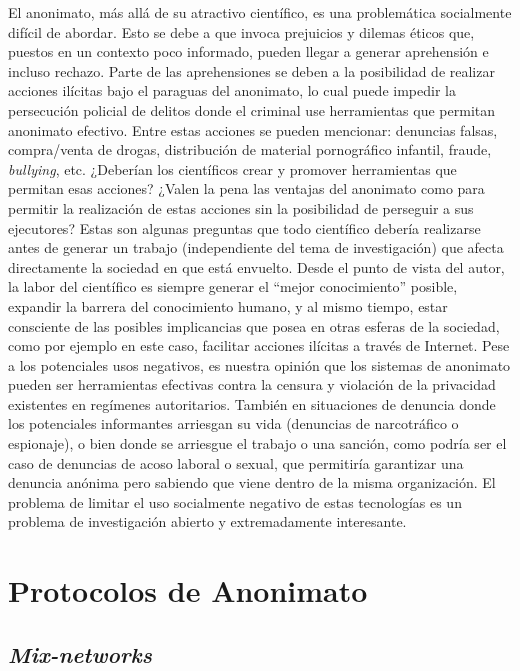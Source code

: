 El anonimato, más allá de su atractivo científico, es una problemática 
socialmente difícil de abordar. Esto se debe a que invoca prejuicios y dilemas 
éticos que, puestos en un contexto poco informado, pueden llegar a generar 
aprehensión e incluso rechazo. Parte de las aprehensiones se deben a la 
posibilidad de realizar acciones ilícitas bajo el paraguas del anonimato, lo 
cual puede impedir la persecución policial de delitos donde el criminal use 
herramientas que permitan anonimato efectivo. Entre estas acciones se pueden 
mencionar: denuncias falsas, compra/venta de drogas, distribución de material 
pornográfico infantil, fraude, \emph{bullying}, etc. ¿Deberían los científicos 
crear y promover herramientas que permitan esas acciones? ¿Valen la pena las 
ventajas del anonimato como para permitir la realización de estas acciones sin 
la posibilidad de perseguir a sus ejecutores? Estas son algunas preguntas que 
todo científico debería realizarse antes de generar un trabajo (independiente 
del tema de investigación) que afecta directamente la sociedad en que está 
envuelto. Desde el punto de vista del autor, la labor del científico es 
siempre generar el ``mejor conocimiento'' posible, expandir la barrera del 
conocimiento humano, y al mismo tiempo, estar consciente de las posibles 
implicancias que posea en otras esferas de la sociedad, como por ejemplo en 
este caso, facilitar acciones ilícitas a través de Internet. Pese a los 
potenciales usos negativos, es nuestra opinión que los sistemas de anonimato 
pueden ser herramientas efectivas contra la censura y violación de la 
privacidad existentes en regímenes autoritarios. También en situaciones de 
denuncia donde los potenciales informantes arriesgan su vida (denuncias de 
narcotráfico o espionaje), o bien donde se arriesgue el trabajo o una sanción, 
como podría ser el caso de denuncias de acoso laboral o sexual, que permitiría 
garantizar una denuncia anónima pero sabiendo que viene dentro de la misma 
organización. El problema de limitar el uso socialmente negativo 
de estas tecnologías es un problema de investigación abierto y extremadamente 
interesante.  

\section{Protocolos de Anonimato}

\subsection{\emph{Mix-networks}}

